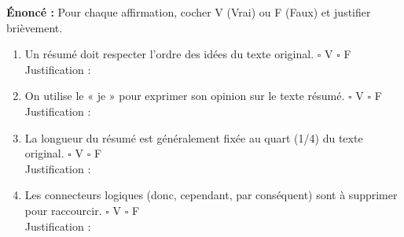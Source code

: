 \documentclass[11pt]{article}
\begin{document}
\begin{exercice}
\textbf{Énoncé :} Pour chaque affirmation, cocher V (Vrai) ou F (Faux) et justifier brièvement.
\begin{enumerate}
    \item Un résumé doit respecter l'ordre des idées du texte original. \hfill $\square$ V \quad $\square$ F \\
    Justification : \underline{\hspace{14cm}}
    \item On utilise le « je » pour exprimer son opinion sur le texte résumé. \hfill $\square$ V \quad $\square$ F \\
    Justification : \underline{\hspace{14cm}}
    \item La longueur du résumé est généralement fixée au quart (1/4) du texte original. \hfill $\square$ V \quad $\square$ F \\
    Justification : \underline{\hspace{14cm}}
    \item Les connecteurs logiques (donc, cependant, par conséquent) sont à supprimer pour raccourcir. \hfill $\square$ V \quad $\square$ F \\
    Justification : \underline{\hspace{14cm}}
\end{enumerate}
\end{exercice}
\end{document}
